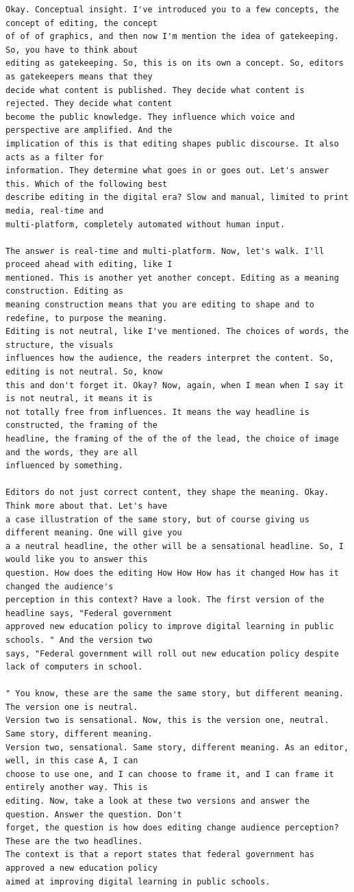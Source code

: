 {\begin{Verbatim}
Okay. Conceptual insight. I've introduced you to a few concepts, the concept of editing, the concept
of of of graphics, and then now I'm mention the idea of gatekeeping. So, you have to think about
editing as gatekeeping. So, this is on its own a concept. So, editors as gatekeepers means that they
decide what content is published. They decide what content is rejected. They decide what content
become the public knowledge. They influence which voice and perspective are amplified. And the
implication of this is that editing shapes public discourse. It also acts as a filter for
information. They determine what goes in or goes out. Let's answer this. Which of the following best
describe editing in the digital era? Slow and manual, limited to print media, real-time and
multi-platform, completely automated without human input.

The answer is real-time and multi-platform. Now, let's walk. I'll proceed ahead with editing, like I
mentioned. This is another yet another concept. Editing as a meaning construction. Editing as
meaning construction means that you are editing to shape and to redefine, to purpose the meaning.
Editing is not neutral, like I've mentioned. The choices of words, the structure, the visuals
influences how the audience, the readers interpret the content. So, editing is not neutral. So, know
this and don't forget it. Okay? Now, again, when I mean when I say it is not neutral, it means it is
not totally free from influences. It means the way headline is constructed, the framing of the
headline, the framing of the of the of the lead, the choice of image and the words, they are all
influenced by something.

Editors do not just correct content, they shape the meaning. Okay. Think more about that. Let's have
a case illustration of the same story, but of course giving us different meaning. One will give you
a a neutral headline, the other will be a sensational headline. So, I would like you to answer this
question. How does the editing How How How has it changed How has it changed the audience's
perception in this context? Have a look. The first version of the headline says, "Federal government
approved new education policy to improve digital learning in public schools. " And the version two
says, "Federal government will roll out new education policy despite lack of computers in school.

" You know, these are the same the same story, but different meaning. The version one is neutral.
Version two is sensational. Now, this is the version one, neutral. Same story, different meaning.
Version two, sensational. Same story, different meaning. As an editor, well, in this case A, I can
choose to use one, and I can choose to frame it, and I can frame it entirely another way. This is
editing. Now, take a look at these two versions and answer the question. Answer the question. Don't
forget, the question is how does editing change audience perception? These are the two headlines.
The context is that a report states that federal government has approved a new education policy
aimed at improving digital learning in public schools.


\end{Verbatim}}
